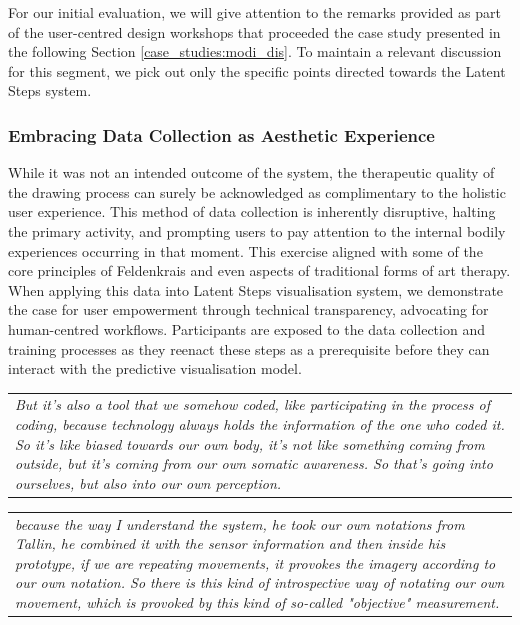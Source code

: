 For our initial evaluation, we will give attention to the remarks provided as part of the user-centred design workshops that proceeded the case study presented in the following Section \ref{case_studies:modi_dis}. To maintain a relevant discussion for this segment, we pick out only the specific points directed towards the Latent Steps system.

\subsubsection{Embracing Data Collection as Aesthetic Experience}

While it was not an intended outcome of the system, the therapeutic quality of the drawing process can surely be acknowledged as complimentary to the holistic user experience. This method of data collection is inherently disruptive, halting the primary activity, and prompting users to pay attention to the internal bodily experiences occurring in that moment. This exercise aligned with some of the core principles of Feldenkrais and even aspects of traditional forms of art therapy. When applying this data into Latent Steps visualisation system, we demonstrate the case for user empowerment through technical transparency, advocating for human-centred workflows. Participants are exposed to the data collection and training processes as they reenact these steps as a prerequisite before they can interact with the predictive visualisation model.

\begin{center}
\begin{tabular}{ p{13cm}}
\textit{But it's also a tool that we somehow coded, like participating in the process of coding, because technology always holds the information of the one who coded it. So it's like biased towards our own body, it's not like something coming from outside, but it's coming from our own somatic awareness. So that's going into ourselves, but also into our own perception.}
\end{tabular}
\end{center}

\begin{center}
\begin{tabular}{ p{13cm}}
\textit{because the way I understand the system, he took our own notations from Tallin, he combined it with the sensor information and then inside his prototype, if we are repeating movements, it provokes the imagery according to our own notation. So there is this kind of introspective way of notating our own movement, which is provoked by this kind of so-called "objective" measurement.}
\end{tabular}
\end{center}

